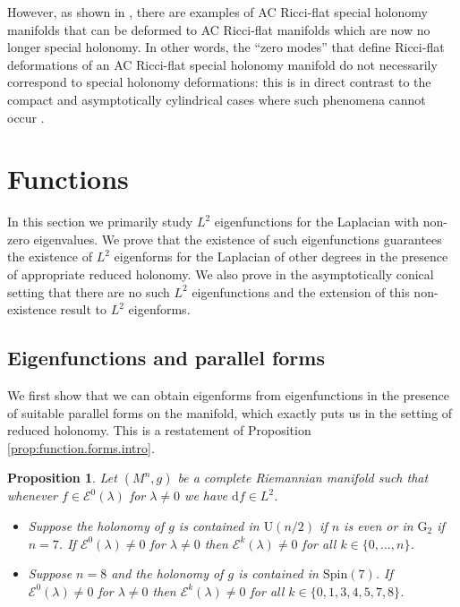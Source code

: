 \documentclass{article}
\newtheorem{prop}[thm]{Proposition}
\theoremstyle{definition}
\numberwithin{thm}{section}
\numberwithin{equation}{section}
\def\d{\mathrm{d}}
\begin{document}
However, as shown in \cite{Chi}, there are examples of AC Ricci-flat special holonomy manifolds that can be deformed to AC Ricci-flat manifolds which are now no longer special holonomy.  In other words, the ``zero modes'' that define Ricci-flat deformations of an AC Ricci-flat special holonomy manifold do not necessarily correspond to special holonomy deformations: this is in direct contrast to the compact   and asymptotically cylindrical cases where such phenomena cannot occur \cite{Kovalev,Nordstrom,McKWang}.

 
\section{Functions}\label{sec:functions}

In this section we primarily study $L^2$ eigenfunctions for the Laplacian with non-zero eigenvalues.  We prove that the existence of such eigenfunctions guarantees the existence of $L^2$ eigenforms for the Laplacian of other degrees in the presence of appropriate reduced holonomy.  We also prove in the asymptotically conical setting that there are no such $L^2$ eigenfunctions and the extension of this non-existence result to $L^2$ eigenforms.

\subsection{Eigenfunctions and parallel forms}

We first show that we can obtain eigenforms from eigenfunctions in the presence of suitable parallel forms on the manifold, which exactly puts us in the setting of reduced holonomy.  This is a restatement of Proposition \ref{prop:function.forms.intro}.  

\begin{prop}\label{prop:functions.forms}
Let $(M^n,g)$ be a complete Riemannian manifold such that whenever $f\in \mathcal{E}^0(\lambda)$ for $\lambda\neq 0$ we have $\d f\in L^2$. 
\begin{itemize}
\item[(a)] Suppose the holonomy of $g$ is contained in $\mathrm{U}(n/2)$ if $n$ is even  
or in $\mathrm{G}_2$ if $n=7$.  
 If $\mathcal{E}^0(\lambda)\neq 0$ for $\lambda\neq 0$ then $\mathcal{E}^k(\lambda)\neq 0$ for all $k\in\{0,\ldots,n\}$.  
\item[(b)] Suppose $n=8$ and the holonomy of $g$ is contained in $\mathrm{Spin}(7)$.  
 If $\mathcal{E}^0(\lambda)\neq 0$ for $\lambda\neq 0$ then $\mathcal{E}^k(\lambda)\neq 0$ for all $k\in\{0,1,3,4,5,7,8\}$.
\end{itemize}
\end{prop}
\end{document}
